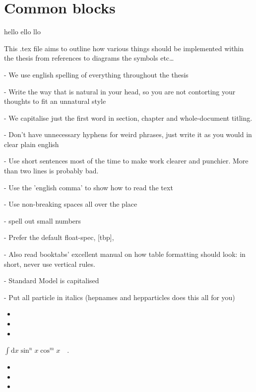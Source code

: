 \chapter{Common blocks}
\label{chap:common}


hello ello llo

This .tex file aims to outline how various things should be implemented within the thesis
from references to diagrams the symbols etc\dots

- We use english spelling of everything throughout the thesis

- Write the way that is natural in your head, so you are not contorting your thoughts to fit an unnatural style

- We capitalise just the first word in section, chapter and whole-document titling.

- Don't have unnecessary hyphens for weird phrases, just write it as you would in clear plain english

- Use short sentences most of the time to make work clearer and punchier. More than two lines is probably bad.

- Use the 'english comma' to show how to read the text

- Use non-breaking spaces all over the place ~

- spell out small numbers

- Prefer the default float-spec, [tbp],

- Also read booktabs’ excellent manual on how table formatting should look: in short, never use vertical rules.

- Standard Model is capitalised

- Put all particle in italics (hepnames and hepparticles does this all for you)

\begin{itemize}
    \item \eV
    \item {}\xspace
    \item \minos
\end{itemize}

\eV

\CC

\xspace

$\int \mathrm{d}x \sin^n{x} \cos^m{x} \quad .$

\begin{itemize}
    \item \chips
    \item \nova
    \item \minos
\end{itemize}

